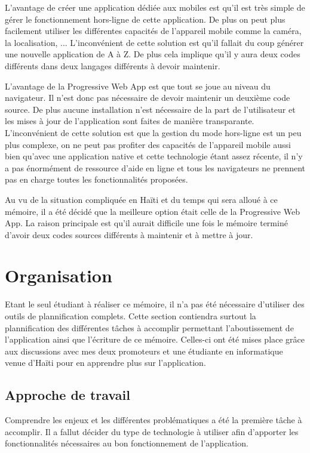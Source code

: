 \documentclass{EPL-master-thesis-covers-FR}
\begin{document}
			L'avantage de créer une application dédiée aux mobiles est qu'il est très simple de gérer le fonctionnement hors-ligne de cette application. De plus on peut plus facilement utiliser les différentes capacités de l'appareil mobile comme la caméra, la localisation, ...
			L'inconvénient de cette solution est qu'il fallait du coup générer une nouvelle application de A à Z. De plus cela implique qu'il y aura deux codes différents dans deux langages différents à devoir maintenir.
				
			L'avantage de la Progressive Web App est que tout se joue au niveau du navigateur. Il n'est donc pas nécessaire de devoir maintenir un deuxième code source. De plus aucune installation n'est nécessaire de la part de l'utilisateur et les mises à jour de l'application sont faites de manière transparante.
			L'inconvénient de cette solution est que la gestion du mode hors-ligne est un peu plus complexe, on ne peut pas profiter des capacités de l'appareil mobile aussi bien qu'avec une application native et cette technologie étant assez récente, il n'y a pas énormément de ressource d'aide en ligne et tous les navigateurs ne prennent pas en charge toutes les fonctionnalités proposées.
				
			Au vu de la situation compliquée en Haïti et du temps qui sera alloué à ce mémoire, il a été décidé que la meilleure option était celle de la Progressive Web App. La raison principale est qu'il aurait difficile une fois le mémoire terminé d'avoir deux codes sources différents à maintenir et à mettre à jour.

	\chapter{Organisation}
		

		Etant le seul étudiant à réaliser ce mémoire, il n'a pas été nécessaire d'utiliser des outils de plannification complets. Cette section contiendra surtout la plannification des différentes tâches à accomplir permettant l'aboutissement de l'application ainsi que l'écriture de ce mémoire. Celles-ci ont été mises place grâce aux discussions avec mes deux promoteurs et une étudiante en informatique venue d'Haïti pour en apprendre plus sur l'application. 

		\section{Approche de travail}
			Comprendre les enjeux et les différentes problématiques a été la première tâche à accomplir. Il a fallut décider du type de technologie à utiliser afin d'apporter les fonctionnalités nécessaires au bon fonctionnement de l'application. 
			
\end{document}
